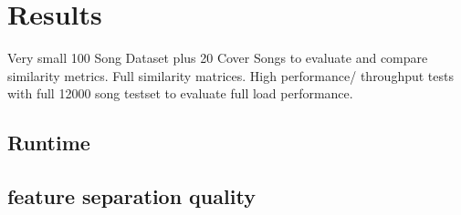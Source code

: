 
\chapter{Results}\label{bds2}

Very small 100 Song Dataset plus 20 Cover Songs to evaluate and compare similarity metrics. Full similarity matrices. 
High performance/ throughput tests with full 12000 song testset to evaluate full load performance.\\

\section{Runtime}

\section{feature separation quality}


